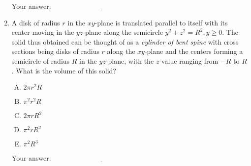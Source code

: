 \documentclass[10pt]{amsart}
\begin{document}
\begin{enumerate}
  \vspace{0.1in}
  Your answer: $\underline{\qquad\qquad\qquad\qquad\qquad\qquad\qquad}$
  \vspace{0.6in}

\item A disk of radius $r$ in the $xy$-plane is translated parallel to
  itself with its center moving in the $yz$-plane along the semicircle
  $y^2 + z^2 = R^2, y \ge 0$. The solid thus obtained can be thought
  of as a {\em cylinder of bent spine} with cross sections being disks
  of radius $r$ along the $xy$-plane and the centers forming a
  semicircle of radius $R$ in the $yz$-plane, with the $z$-value
  ranging from $-R$ to $R$. What is the volume of this solid?

  \begin{enumerate}[(A)]
  \item $2\pi r^2R$
  \item $\pi^2r^2R$
  \item $2\pi rR^2$
  \item $\pi^2rR^2$
  \item $\pi^2R^3$
  \end{enumerate}

  \vspace{0.1in}
  Your answer: $\underline{\qquad\qquad\qquad\qquad\qquad\qquad\qquad}$
  \vspace{0.6in}

\end{enumerate}
\end{document}
